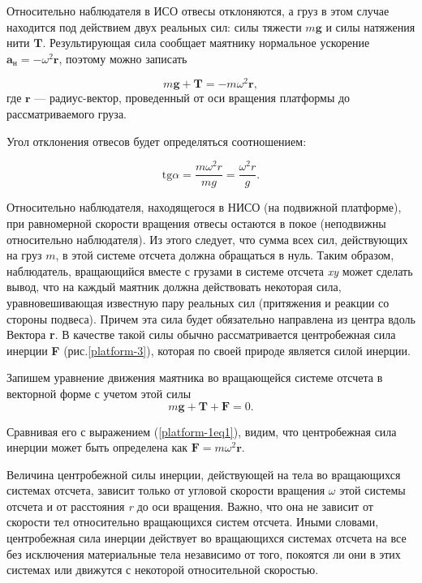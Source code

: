 \documentclass[14pt,a4paper,oneside]{extarticle}	%
\begin{document}
Относительно наблюдателя в ИСО отвесы отклоняются, а груз в этом случае находится под действием двух реальных сил: силы тяжести $ m\textbf{g} $ и силы натяжения нити $ \textbf{T} $.
Результирующая сила сообщает маятнику нормальное ускорение $ \textbf{a}_{\text{н}} = -\omega^{2}\textbf{r}  $, поэтому можно записать

\begin{equation}\label{platform-1eq1}
m\textbf{g}+\textbf{T}=-m\omega^{2}\textbf{r},
\end{equation}
где $ \textbf{r} $ — радиус-вектор, проведенный от оси вращения платформы до рассматриваемого груза.

Угол отклонения отвесов будет определяться соотношением:

\begin{equation}\label{platform-1eq2}
\text{tg} \alpha =\frac{m\omega^{2}r}{mg} = \frac{\omega^{2}r}{g}.
\end{equation}

Относительно наблюдателя, находящегося в НИСО (на подвижной платформе), при равномерной скорости вращения отвесы остаются в покое (неподвижны относительно наблюдателя).
Из этого следует, что сумма всех сил, действующих на груз $ m $, в этой системе отсчета должна обращаться в нуль.
Таким образом, наблюдатель, вращающийся вместе с грузами в системе отсчета \textit{xy} может сделать вывод, что на каждый маятник должна действовать некоторая сила, уравновешивающая известную пару реальных сил (притяжения и реакции со стороны подвеса).
Причем эта сила будет обязательно направлена из центра вдоль Вектора \textbf{r}. 
В качестве такой силы обычно рассматривается центробежная сила инерции \textbf{F} (рис.\ref{platform-3}), которая по своей природе является силой инерции.

Запишем уравнение движения маятника во вращающейся системе отсчета в векторной форме с учетом этой силы
\begin{equation}\label{platform-1eq3}
m\textbf{g}+\textbf{T}+\textbf{F}=0.
\end{equation}

Сравнивая его с выражением (\ref{platform-1eq1}), видим, что центробежная сила инерции может быть определена как $ \textbf{F}=m\omega^{2}\textbf{r} $.

Величина центробежной силы инерции, действующей на тела во вращающихся системах отсчета, зависит только от угловой скорости вращения $ \omega $ этой системы отсчета и от расстояния \textit{r} до оси вращения.
Важно, что она не зависит от скорости тел относительно вращающихся систем отсчета.
Иными словами, центробежная сила инерции действует во вращающихся системах отсчета на все без исключения материальные тела независимо от того, покоятся ли они в этих системах или движутся с некоторой относительной скоростью.
				
\end{document}
